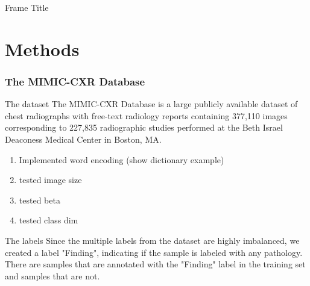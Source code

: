             \begin{frame}{Frame Title}


            \end{frame}

    \section{Methods}
        \subsubsection{The MIMIC-CXR Database}
            \begin{frame}{The dataset}
            The MIMIC-CXR Database \cite{johnson2019mimic} is a large publicly available dataset of chest radiographs with free-text radiology reports containing 377,110 images corresponding to 227,835 radiographic studies performed at the Beth Israel Deaconess Medical Center in Boston, MA.
                
            \end{frame}
            
            \begin{frame}
                \begin{enumerate}
                    \item Implemented word encoding (show dictionary example)
                    \item tested image size
                    \item tested beta
                    \item tested class dim
                \end{enumerate}
            \end{frame}

            \begin{frame}
            \end{frame}
            
            \begin{frame}{The labels}
                Since the multiple labels from the dataset are highly imbalanced, we created a label "Finding", indicating if the sample is labeled with any pathology.\\
                There are  samples that are annotated with the "Finding" label in the training set and  samples that are not.
            \end{frame}
            
